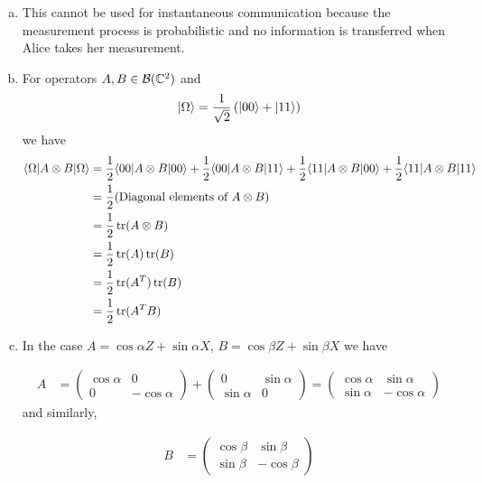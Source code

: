 \documentclass[11pt]{article}
\begin{document}
\begin{enumerate}[(a).]
  \item This cannot be used for instantaneous communication because the measurement process is probabilistic and no information is transferred when Alice takes her measurement.
  
  
  \item For operators  $A, B \in \mathcal{B}(\mathbb{C}^2)$ and $$ \lvert\Omega\rangle = \frac{1}{\sqrt{2}} \left( \lvert00\rangle + \lvert11\rangle \right) $$ we have 
  \begin{align*}
    \langle \Omega | A \otimes B | \Omega \rangle &= \frac{1}{2} \langle 00 | A \otimes B | 00 \rangle +  \frac{1}{2} \langle 00 | A \otimes B | 11 \rangle +  \frac{1}{2} \langle 11 | A \otimes B | 00 \rangle +  \frac{1}{2} \langle 11 | A \otimes B | 11 \rangle  \\
    &= \frac{1}{2} \text{(Diagonal elements of $A \otimes B$)} \\
    &= \frac{1}{2} \operatorname{tr}(A \otimes B) \\
    &= \frac{1}{2} \operatorname{tr}(A) \operatorname{tr}(B) \\
    &= \frac{1}{2} \operatorname{tr}(A^T) \operatorname{tr}(B) \\
    &= \frac{1}{2} \operatorname{tr}(A^T B)
  \end{align*} 

  \item In the case $A = \cos\alpha Z + \sin\alpha X$, $B = \cos\beta Z + \sin \beta X$ we have
  
  \begin{align*}
    A &= \begin{pmatrix}
      \cos\alpha & 0 \\
      0 & -\cos\alpha
    \end{pmatrix} + \begin{pmatrix}
      0 & \sin\alpha \\
      \sin\alpha & 0
    \end{pmatrix} = \begin{pmatrix}
      \cos\alpha & \sin\alpha \\
      \sin\alpha & -\cos\alpha
    \end{pmatrix} 
  \end{align*} and similarly,

  \begin{align*}
    B &= \begin{pmatrix}
      \cos\beta & \sin\beta \\
      \sin\beta & -\cos\beta
    \end{pmatrix}
  \end{align*}


\end{enumerate}
\end{document}
